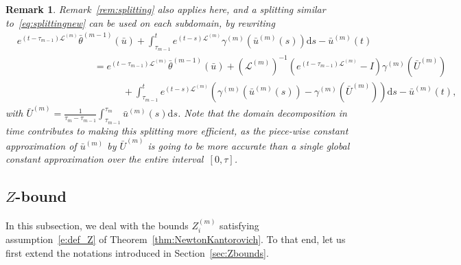 \documentclass[10pt,a4paper]{article}
\theoremstyle{plain}
\newtheorem{remark}[theorem]{Remark}
\renewcommand{\L}{\mathcal{L}}
\newcommand{\bu}{\bar{u}}
\newcommand{\bU}{\bar{U}}
\newcommand{\btheta}{\bar{\theta}}
\newcommand{\1}{\mathbf{1}}
\begin{document}
\begin{remark}
Remark~\ref{rem:splitting} also applies here, and a splitting similar to~\eqref{eq:splittingnew} can be used on each subdomain, by rewriting 
\begin{align*}
&e^{(t-\tau_{m-1})\L^{(m)}} \btheta^{(m-1)}(\bu) +  \int_{\tau_{m-1}}^{t} e^{(t-s)\L^{(m)} } 
		\gamma^{(m)}\left(\bu^{(m)}(s)\right) \mbox{d} s - \bu^{(m)} \left( t \right)   \\
		&\qquad\qquad\qquad\qquad = e^{(t-\tau_{m-1})\L^{(m)}} \btheta^{(m-1)}(\bu) + (\L^{(m)})^{-1}\left(e^{(t-\tau_{m-1})\L^{(m)}}-I\right)\gamma^{(m)}(\bU^{(m)}) \\
		&\qquad\qquad \quad\qquad\qquad\qquad +  \int_{\tau_{m-1}}^{t} e^{(t-s)\L^{(m)} } 
		\left(\gamma^{(m)}\left(\bu^{(m)}(s)\right)-\gamma^{(m)}\left(\bU^{(m)}\right)\right) \mbox{d} s - \bu^{(m)} \left( t \right) ,
\end{align*}
with
$\bU^{(m)} = \frac{1}{\tau_m-\tau_{m-1}}\int_{\tau_{m-1}}^{\tau_m} \bu^{(m)}(s) \mbox{d} s$.
Note that the domain decomposition in time contributes to making this splitting more efficient, as the piece-wise constant approximation of $\bu^{(m)}$ by $\bU^{(m)}$ is going to be more accurate than a single global constant approximation over the entire interval~$[0,\tau]$.
\end{remark}



\subsection{$Z$-bound}
\label{sec:Zbounds_DD}

In this subsection, we deal with the bounds $Z^{(m)}_i$ satisfying assumption~\eqref{e:def_Z} of Theorem~\ref{thm:NewtonKantorovich}. 
To that end, let us first extend the notations introduced in Section~\ref{sec:Zbounds}.
\end{document}
